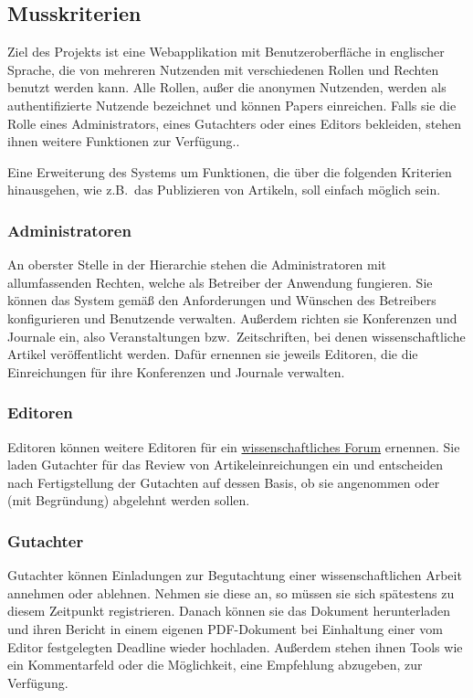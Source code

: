 
\subsection{Musskriterien}
Ziel des Projekts ist eine Webapplikation mit Benutzeroberfläche in englischer Sprache, die von mehreren Nutzenden mit verschiedenen Rollen und Rechten benutzt werden kann.
Alle Rollen, außer die anonymen Nutzenden, werden als authentifizierte Nutzende bezeichnet und können Papers einreichen. Falls sie die Rolle eines Administrators, eines Gutachters oder eines Editors bekleiden, stehen ihnen weitere Funktionen zur Verfügung..

Eine Erweiterung des Systems um Funktionen, die über die folgenden Kriterien hinausgehen, wie z.B.\ das Publizieren von Artikeln, soll einfach möglich sein.

\subsubsection{Administratoren}
An oberster Stelle in der Hierarchie stehen die Administratoren mit allumfassenden Rechten, welche als Betreiber der Anwendung fungieren.
Sie können das System gemäß den Anforderungen und Wünschen des Betreibers konfigurieren und Benutzende verwalten.
Außerdem richten sie Konferenzen und Journale ein, also Veranstaltungen bzw.\ Zeitschriften, bei denen wissenschaftliche Artikel veröffentlicht werden.
Dafür ernennen sie jeweils Editoren, die die Einreichungen für ihre Konferenzen und Journale verwalten.

\subsubsection{Editoren}
Editoren können weitere Editoren für ein \hyperref[glo:wissForum]{wissenschaftliches Forum} ernennen.
Sie laden Gutachter für das Review von Artikeleinreichungen ein und entscheiden nach Fertigstellung der Gutachten auf dessen Basis, ob sie angenommen oder (mit Begründung) abgelehnt werden sollen.

\subsubsection{Gutachter}
Gutachter können Einladungen zur Begutachtung einer wissenschaftlichen Arbeit annehmen oder ablehnen.
Nehmen sie diese an, so müssen sie sich spätestens zu diesem Zeitpunkt registrieren.
Danach können sie das Dokument herunterladen und ihren Bericht in einem eigenen PDF-Dokument bei Einhaltung einer vom Editor festgelegten Deadline wieder hochladen.
Außerdem stehen ihnen Tools wie ein Kommentarfeld oder die Möglichkeit, eine Empfehlung abzugeben, zur Verfügung.

